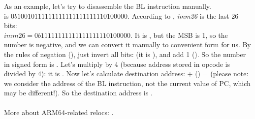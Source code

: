 As an example, let's try to disassemble the BL instruction manually.\\
 is $0b10010111111111111111111110100000$.
According to , \emph{imm26} is the last 26 bits:\\
$imm26 = 0b11111111111111111110100000$.
It is , but the \ac{MSB} is 1, 
so the number is negative, and we can convert it manually to convenient form for us.
By the rules of negation (), just invert all bits: (it is ), and add 1 ().
So the number in signed form is .
Let's multiply  by 4 (because address stored in opcode is divided by 4): it is .
Now let's calculate destination address:  + () =  
(please note: we consider the address of the BL instruction, not the current value of \ac{PC}, which may be different!).
So the destination address is .\\
\\
More about ARM64-related relocs: \ARMELF.
